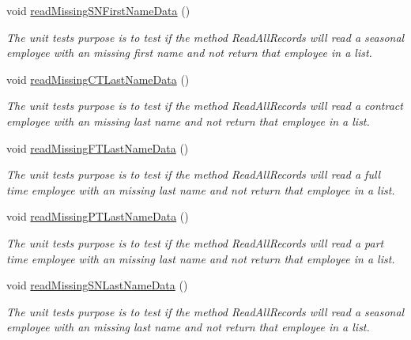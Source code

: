 \begin{DoxyCompactItemize}
void \hyperlink{class_file_i_o_tests_1_1_file_i_o_tests_ae0b0cedc850efac31319b8f236d7871c}{read\+Missing\+S\+N\+First\+Name\+Data} ()
\begin{DoxyCompactList}\small\item\em The unit test\textquotesingle{}s purpose is to test if the method Read\+All\+Records will read a seasonal employee with an missing first name and not return that employee in a list. \end{DoxyCompactList}\item 
void \hyperlink{class_file_i_o_tests_1_1_file_i_o_tests_a55d29fa7f328d5f09012e21cf1e4e8fa}{read\+Missing\+C\+T\+Last\+Name\+Data} ()
\begin{DoxyCompactList}\small\item\em The unit test\textquotesingle{}s purpose is to test if the method Read\+All\+Records will read a contract employee with an missing last name and not return that employee in a list. \end{DoxyCompactList}\item 
void \hyperlink{class_file_i_o_tests_1_1_file_i_o_tests_a6dfd45892de70caf28049718709666d9}{read\+Missing\+F\+T\+Last\+Name\+Data} ()
\begin{DoxyCompactList}\small\item\em The unit test\textquotesingle{}s purpose is to test if the method Read\+All\+Records will read a full time employee with an missing last name and not return that employee in a list. \end{DoxyCompactList}\item 
void \hyperlink{class_file_i_o_tests_1_1_file_i_o_tests_aa71f71dbc3fb607eb95d7f6791476f18}{read\+Missing\+P\+T\+Last\+Name\+Data} ()
\begin{DoxyCompactList}\small\item\em The unit test\textquotesingle{}s purpose is to test if the method Read\+All\+Records will read a part time employee with an missing last name and not return that employee in a list. \end{DoxyCompactList}\item 
void \hyperlink{class_file_i_o_tests_1_1_file_i_o_tests_a558369745ee3a55e37bd0838a798e4ee}{read\+Missing\+S\+N\+Last\+Name\+Data} ()
\begin{DoxyCompactList}\small\item\em The unit test\textquotesingle{}s purpose is to test if the method Read\+All\+Records will read a seasonal employee with an missing last name and not return that employee in a list. \end{DoxyCompactList}\item 

\end{DoxyCompactItemize}
